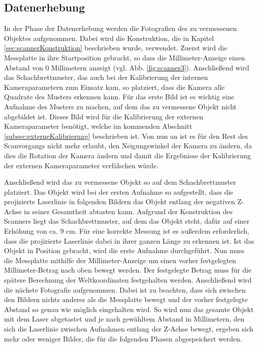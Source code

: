 \subsection{Datenerhebung}
\label{subsec:Datenerhebung}
In der Phase der Datenerhebung werden die Fotografien des zu vermessenen Objektes aufgenommen. Dabei wird die Konstruktion, die in Kapitel \ref{sec:scannerKonstruktion} beschrieben wurde, verwendet. Zuerst wird die Messplatte in ihre Startposition gebracht, so dass die Millimeter-Anzeige einen Abstand von 0 Millimetern anzeigt (vgl. Abb. \ref{fig:scanner3}). Anschließend wird das Schachbrettmuster, das auch bei der Kalibrierung der internen Kameraparametern zum Einsatz kam, so platziert, dass die Kamera alle Quadrate des Musters erkennen kann. Für das erste Bild ist es wichtig eine Aufnahme des Musters zu machen, auf dem das zu vermessene Objekt nicht abgebildet ist. Dieses Bild wird für die Kalibrierung der externen Kameraparameter benötigt, welche im kommenden Abschnitt \ref{subsec:externeKalibrierung} beschrieben ist. Von nun an ist es für den Rest des Scanvorgangs nicht mehr erlaubt, den Neigungswinkel der Kamera zu ändern, da dies die Rotation der Kamera ändern und damit die Ergebnisse der Kalibrierung der externen Kameraparameter verfälschen würde.
\bigbreak

Anschließend wird das zu vermessene Objekt so auf dem Schachbrettmuster platziert. Das Objekt wird bei der ersten Aufnahme so aufgestellt, dass die projizierte Laserlinie in folgenden Bildern das Objekt entlang der negativen Z-Achse in seiner Gesamtheit abtasten kann. Aufgrund der Konstruktion des Scanners liegt das Schachbrettmuster, auf dem das Objekt steht, dafür auf einer Erhöhung von ca. 9 cm. Für eine korrekte Messung ist es außerdem erforderlich, dass die projizierte Laserlinie dabei in ihrer ganzen Länge zu erkennen ist. Ist das Objekt in Position gebracht, wird die erste Aufnahme durchgeführt. Nun muss die Messplatte mithilfe der Millimeter-Anzeige um einen vorher festgelegten Millimeter-Betrag nach oben bewegt werden. Der festgelegte Betrag muss für die spätere Berechnung der Weltkoordinaten festgehalten werden. Anschließend wird die nächste Fotografie aufgenommen. Dabei ist zu beachten, dass sich zwischen den Bildern nichts anderes als die Messplatte bewegt und der vorher festgelegte Abstand so genau wie möglich eingehalten wird. So wird nun das gesamte Objekt mit dem Laser abgetastet und je nach gewähltem Abstand in Millimetern, den sich die Laserlinie zwischen Aufnahmen entlang der Z-Achse bewegt, ergeben sich mehr oder weniger Bilder, die für die folgenden Phasen abgespeichert werden.      

